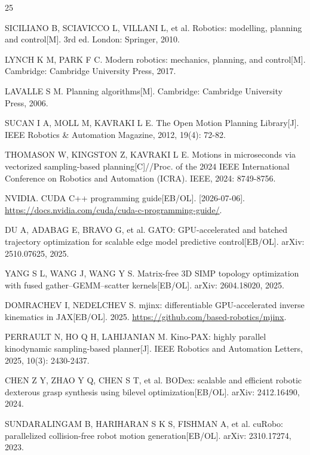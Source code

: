 \documentclass[twocolumn,a4paper,10pt]{ctexart}
\begin{document}
\FloatBarrier
\begin{thebibliography}{25}

SICILIANO B, SCIAVICCO L, VILLANI L, et al. Robotics: modelling, planning and control[M]. 3rd ed. London: Springer, 2010.

LYNCH K M, PARK F C. Modern robotics: mechanics, planning, and control[M]. Cambridge: Cambridge University Press, 2017.

LAVALLE S M. Planning algorithms[M]. Cambridge: Cambridge University Press, 2006.

SUCAN I A, MOLL M, KAVRAKI L E. The Open Motion Planning Library[J]. IEEE Robotics \& Automation Magazine, 2012, 19(4): 72-82.

THOMASON W, KINGSTON Z, KAVRAKI L E. Motions in microseconds via vectorized sampling-based planning[C]//Proc. of the 2024 IEEE International Conference on Robotics and Automation (ICRA). IEEE, 2024: 8749-8756.

NVIDIA. CUDA C++ programming guide[EB/OL]. [2026-07-06]. \url{https://docs.nvidia.com/cuda/cuda-c-programming-guide/}.

DU A, ADABAG E, BRAVO G, et al. GATO: GPU-accelerated and batched trajectory optimization for scalable edge model predictive control[EB/OL]. arXiv: 2510.07625, 2025.

YANG S L, WANG J, WANG Y S. Matrix-free 3D SIMP topology optimization with fused gather–GEMM–scatter kernels[EB/OL]. arXiv: 2604.18020, 2025.

DOMRACHEV I, NEDELCHEV S. mjinx: differentiable GPU-accelerated inverse kinematics in JAX[EB/OL]. 2025. \url{https://github.com/based-robotics/mjinx}.

PERRAULT N, HO Q H, LAHIJANIAN M. Kino-PAX: highly parallel kinodynamic sampling-based planner[J]. IEEE Robotics and Automation Letters, 2025, 10(3): 2430-2437.

CHEN Z Y, ZHAO Y Q, CHEN S T, et al. BODex: scalable and efficient robotic dexterous grasp synthesis using bilevel optimization[EB/OL]. arXiv: 2412.16490, 2024.

SUNDARALINGAM B, HARIHARAN S K S, FISHMAN A, et al. cuRobo: parallelized collision-free robot motion generation[EB/OL]. arXiv: 2310.17274, 2023.


\end{thebibliography}
\end{document}

